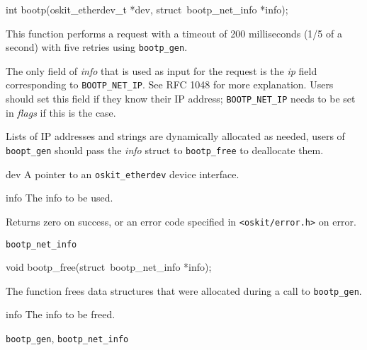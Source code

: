 %
%
\begin{apisyn}

	\funcproto int bootp(oskit_etherdev_t *dev, 
		\inoutparam struct~bootp_net_info *info);
\end{apisyn}
\begin{apidesc}
	This function performs a \bootp{} request with
	a timeout of 200 milliseconds (1/5 of a second) with five retries
	using \texttt{bootp_gen}.

	The only field of \emph{info} that is used as input for the request
	is the \emph{ip} field corresponding to \texttt{BOOTP_NET_IP}.
	See RFC 1048 for more explanation. Users should set this
	field if they know their IP address; \texttt{BOOTP_NET_IP}
	needs to be set in \emph{flags} if this is the case.

	Lists of IP addresses and strings are dynamically
	allocated as needed, users of \texttt{boopt_gen}
	should pass the \emph{info} struct to 
	\texttt{bootp_free} to deallocate them.
\end{apidesc}
\begin{apiparm}
	\item[dev]
		A pointer to an \texttt{oskit_etherdev} device interface.
	\item[info]
		The \bootp{} info to be used.
\end{apiparm}
\begin{apiret}
	Returns zero on success, or an error code specified in
	{\tt <oskit/error.h>} on error.
\end{apiret}
\begin{apirel}
	\texttt{bootp_net_info}
\end{apirel}

%
%
\begin{apisyn}

	\funcproto void bootp_free(\inoutparam struct~bootp_net_info *info);
\end{apisyn}
\begin{apidesc}
	The function frees data structures that were allocated
	during a call to \texttt{bootp_gen}.
\end{apidesc}
\begin{apiparm}
	\item[info]
		The \bootp{} info to be freed.
\end{apiparm}
\begin{apirel}
	\texttt{bootp_gen},
	\texttt{bootp_net_info}
\end{apirel}

